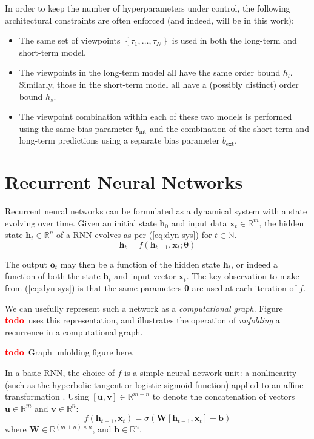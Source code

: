 \documentclass[12pt,a4paper,twoside,openright]{report}
\newcommand{\set}[1]{ \left\{ #1 \right\} }
\newcommand{\vect}[1]{\boldsymbol{\mathbf{#1}}}
\newcommand{\todo}{\textcolor{red}{\textbf{todo}~}}
\begin{document}
In order to keep the number of hyperparameters under control, the following
architectural constraints are often enforced (and indeed, will be in this work):
\begin{itemize}
  \item The same set of viewpoints $\set{\tau_1, \ldots, \tau_N}$ is used in both
    the long-term and short-term model. 
  \item The viewpoints in the long-term model all have the same order bound
    $h_l$. Similarly, those in the short-term model all have a (possibly
    distinct) order bound $h_s$.
  \item The viewpoint combination within each of these two models is performed
    using the same bias parameter $b_{\mathrm{int}}$ and the combination of the
    short-term and long-term predictions using a separate bias parameter
    $b_{\mathrm{ext}}$.
\end{itemize}

\section{Recurrent Neural Networks}\label{sec:rnn-intro}

Recurrent neural networks can be formulated as a dynamical system with a state
evolving over time. Given an initial state $\vect{h}_0$ and input data
$\vect{x}_t \in \mathbb{R}^m$, the hidden state $\vect{h}_t \in \mathbb{R}^n$ of
a RNN evolves as per (\ref{eq:dyn-sys}) for $t \in \mathbb{N}$.
\begin{equation}
  \vect{h}_t = f(\vect{h}_{t-1}, \vect{x}_t; \vect{\theta})
  \label{eq:dyn-sys}
\end{equation} 

The output
$\vect{o}_t$ may then be a function of the hidden state $\vect{h}_t$, or indeed
a function of both the state $\vect{h}_t$ and input vector $\vect{x}_t$. The key
observation to make from (\ref{eq:dyn-sys}) is that the same parameters
$\vect{\theta}$ are used at each iteration of $f$. 

We can usefully represent such a network as a \emph{computational graph}. Figure
\todo uses this representation, and illustrates the operation of
\emph{unfolding} a recurrence in a computational graph.

\todo Graph unfolding figure here.

In a basic RNN, the choice of $f$ is a simple neural network unit: a
nonlinearity (such as the hyperbolic tangent or logistic sigmoid function)
applied to an affine transformation \cite{zaremba2014recurrent}. Using
$[\vect{u},\vect{v}] \in \mathbb{R}^{m+n}$ to denote the concatenation of
vectors $\vect{u} \in \mathbb{R}^m$ and $\vect{v} \in \mathbb{R}^n$: 
$$f(\vect{h}_{t-1}, \vect{x}_t) = \sigma(\vect{W}[\vect{h}_{t-1}, 
\vect{x}_t] + \vect{b})$$ 
where $\vect{W} \in \mathbb{R}^{(m+n) \times n}$, and $\vect{b} \in
\mathbb{R}^n$. 
\end{document}
